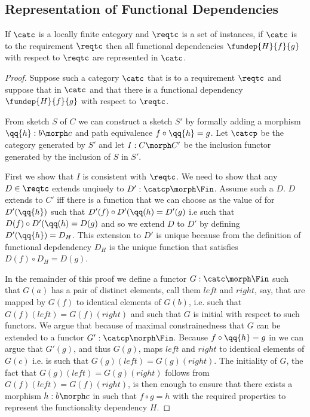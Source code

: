 \subsection{Representation of Functional Dependencies}
\begin{lemma}
If $\catc$ is a locally finite category and $\reqtc$ is a set of instances, if $\catc$ is 
 to the requirement $\reqtc$ then
all functional dependencies $\fundep{H}{f}{g}$  with respect to $\reqtc$ are represented in $\catc$.
\end{lemma}
\begin{proof}
Suppose such a category  $\catc$  that  is 
 to a requirement $\reqtc$ and suppose that
\fgsourcediag in $\catc$ 
and that there is a functional dependency $\fundep{H}{f}{g}$ with respect to $\reqtc$.

From sketch $S$ of $C$ we can construct a sketch $S'$ by formally adding a morphism $\qq{h}: b \morph c$
and path equivalence $f \circ \qq{h} = g$. Let $\catcp$ be the category generated by $S'$ and
let $I: C \morph C'$ be the inclusion functor generated by the inclusion of $S$ in $S'$. 

First we show that $I$ is consistent with $\reqtc$. 
We need to show that any $D \in \reqtc$
extends unqiuely to $D' :\catcp \morph \Fin$. Assume such a $D$. 
$D$  extends to $C'$ iff there is a  function that we can choose as the value of  for $D'(\qq{h})$  such that $D'(f) \circ D'(\qq(h) = D'(g)$ i.e such that
$D(f) \circ D'(\qq(h) = D(g)$ and so we  extend $D$ to $D'$ 
 by defining $D'(\qq{h})=D_H$.
This extension to $D'$ is unique because from the definition of functional depdendency
$D_H$ is the unique function that satisfies $D(f) \circ D_H = D(g)$.

In the remainder of this proof 
we define a functor $G: \catc \morph \Fin$ such that
$G(a)$ has a pair of distinct elements, call them $left$ and $right$, say,  that are mapped by $G(f)$ to identical elements
of $G(b)$, i.e. such that $G(f)(left)= G(f)(right)$ 
and such that $G$ is initial with respect to such functors.  
We  argue that because of  maximal constrainedness that $G$ can be extended to a functor 
$G' : \catcp \morph \Fin$. 
Because $f \circ \qq{h} = g$ in \catcpw we can argue that $G'(g)$,
and thus $G(g)$,
maps $left$ and $right$ to identical elements of $G(c)$ 
i.e. is such that $G(g)(left)= G(g)(right)$. 
The initiality of $G$, the fact that  $G(g)(left)= G(g)(right)$ follows
from $G(f)(left)= G(f)(right)$, is then enough 
to ensure that there exists a morphism $h:b \morph c$ in \catcw
such that $f \circ g = h$
 with the required properties to represent the functionality dependency $H$.


\end{proof}
